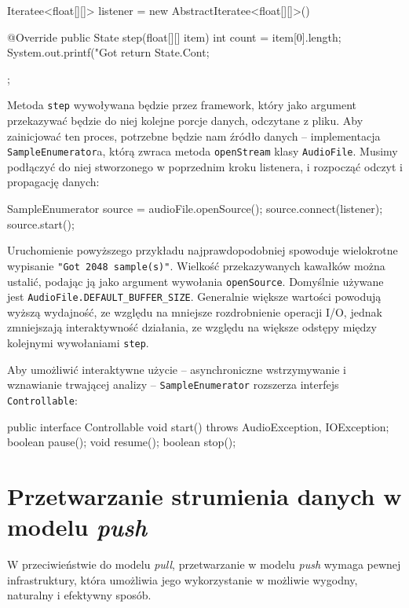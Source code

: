 \begin{java}
Iteratee<float[][]> listener = new AbstractIteratee<float[][]>() {

    @Override
    public State step(float[][] item) {
        int count = item[0].length;
        System.out.printf("Got %
        return State.Cont;
    }
};
\end{java}

Metoda \texttt{step} wywoływana będzie przez framework, który jako argument przekazywać będzie do
niej kolejne porcje danych, odczytane z pliku. Aby zainicjować ten proces, potrzebne będzie nam
źródło danych -- implementacja \texttt{SampleEnumerator}a, którą zwraca metoda \texttt{openStream}
klasy \texttt{AudioFile}.  Musimy podłączyć do niej stworzonego w poprzednim kroku listenera, i
rozpocząć odczyt i propagację danych:

\begin{java}
SampleEnumerator source = audioFile.openSource();
source.connect(listener);
source.start();
\end{java}

Uruchomienie powyższego przykładu najprawdopodobniej spowoduje wielokrotne wypisanie \texttt{"Got
2048 sample(s)"}. Wielkość przekazywanych kawałków można ustalić, podając ją jako argument wywołania
\texttt{openSource}. Domyślnie używane jest \texttt{AudioFile.DEFAULT\_BUFFER\_SIZE}. Generalnie
większe wartości powodują wyższą wydajność, ze względu na mniejsze rozdrobnienie operacji I/O,
jednak zmniejszają interaktywność działania, ze względu na większe odstępy między kolejnymi
wywołaniami \texttt{step}.

Aby umożliwić interaktywne użycie -- asynchroniczne wstrzymywanie i wznawianie trwającej analizy --
\texttt{SampleEnumerator} rozszerza interfejs \texttt{Controllable}:

\begin{java}
public interface Controllable {
    void start() throws AudioException, IOException;
    boolean pause();
    void resume();
    boolean stop();
}
\end{java}

\section{Przetwarzanie strumienia danych w modelu \emph{push}}

W przeciwieństwie do modelu \emph{pull}, przetwarzanie w modelu \emph{push} wymaga pewnej
infrastruktury, która umożliwia jego wykorzystanie w możliwie wygodny, naturalny i efektywny sposób.

